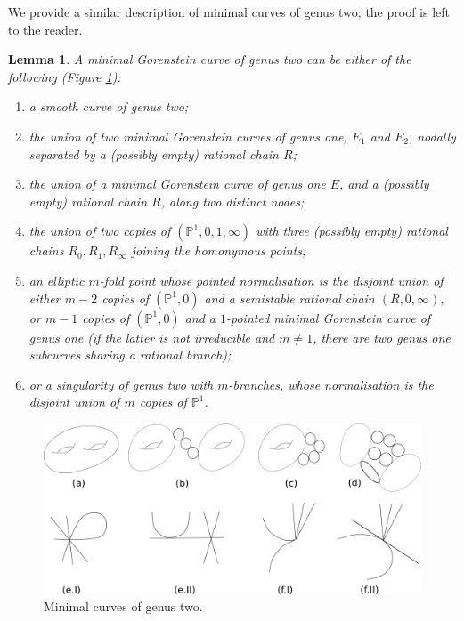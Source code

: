 \documentclass{compositio}
\newcommand{\PP}{\mathbb P}
\theoremstyle{plain}
\newtheorem{lem}[thm]{Lemma}
\theoremstyle{definition}
\theoremstyle{remark}
\begin{document}
We provide a similar description of minimal curves of genus two; the proof is left to the reader.
\begin{lem}\label{lem:min2}
 A minimal Gorenstein curve of genus two can be either of the following (Figure \ref{fig:minimalcurves}):
 \begin{enumerate}[label=(\alph*)]
  \item a smooth curve of genus two;
  \item the union of two minimal Gorenstein curves of genus one, $E_1$ and $E_2$, nodally separated by a (possibly empty) rational chain $R$;
  \item the union of a minimal Gorenstein curve of genus one $E$, and a (possibly empty) rational chain $R$, along two distinct nodes;
  \item the union of two copies of $(\PP^1,0,1,\infty)$ with three (possibly empty) rational chains $R_0, R_1, R_\infty$ joining the homonymous points;
  \item\label{case:twice1} an elliptic $m$-fold point whose pointed normalisation is the disjoint union of either $m-2$ copies of $(\PP^1,0)$ and a semistable rational chain $(R,0,\infty)$, or $m-1$ copies of $(\PP^1,0)$ and a $1$-pointed minimal Gorenstein curve of genus one (if the latter is not irreducible and $m\neq 1$, there are two genus one subcurves sharing a rational branch);
  \item\label{case:2} or a singularity of genus two with $m$-branches, whose normalisation is the disjoint union of $m$ copies of $\PP^1$.
 \end{enumerate}
\end{lem}

\begin{center}
 \begin{figure}
  \includegraphics[width=\textwidth]{minimalcurves}
  \caption{Minimal curves of genus two.}
\label{fig:minimalcurves}
 \end{figure}
\end{center}
\end{document}
